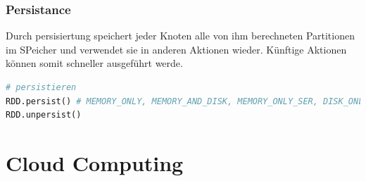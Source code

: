 \documentclass[../Main.tex]{subfiles}
\begin{document}
\subsubsection{Persistance}
Durch persisiertung speichert jeder Knoten alle von ihm berechneten Partitionen im SPeicher und verwendet sie in anderen Aktionen wieder.
Künftige Aktionen können somit schneller ausgeführt werde.

\begin{lstlisting}[language=Python]
# persistieren
RDD.persist() # MEMORY_ONLY, MEMORY_AND_DISK, MEMORY_ONLY_SER, DISK_ONLY
RDD.unpersist()
\end{lstlisting}

\section{Cloud Computing}
\end{document}
